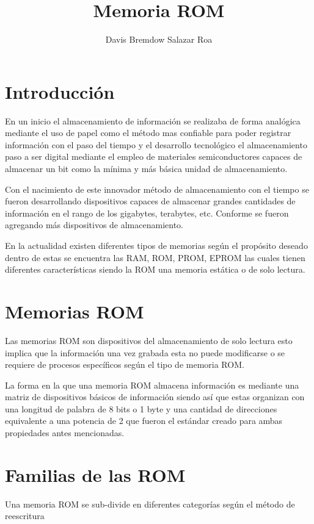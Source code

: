 \documentclass[stu, 12pt, floatsintext, ]{apa7}
\title{Memoria ROM}
\author{Davis Bremdow Salazar Roa}
\begin{document}
	
	\maketitle
	\newpage
	
	\section{Introducción}
	En un inicio el almacenamiento de información se realizaba de forma analógica mediante el uso de papel como el método mas confiable para poder registrar información con el paso del tiempo y el desarrollo tecnológico el almacenamiento paso a ser digital mediante el empleo de materiales semiconductores capaces de almacenar un bit como la mínima y más básica unidad de almacenamiento.
	
	Con el nacimiento de este innovador método de almacenamiento con el tiempo se fueron desarrollando dispositivos capaces de almacenar grandes cantidades de información en el rango de los gigabytes, terabytes, etc. Conforme se fueron agregando más dispositivos de almacenamiento.
	
	En la actualidad existen diferentes tipos de memorias según el propósito deseado dentro de estas se encuentra las RAM, ROM, PROM, EPROM las cuales tienen diferentes características siendo la ROM una memoria estática o de solo lectura.
	
	\newpage
	
	\section{Memorias ROM}
	Las memorias ROM son dispositivos del almacenamiento de solo lectura esto implica que la información una vez grabada esta no puede modificarse o se requiere de procesos específicos según el tipo de memoria ROM.
	
	La forma en la que una memoria ROM almacena información es mediante una matriz de dispositivos básicos de información siendo así que estas organizan con una longitud de palabra de 8 bits o 1 byte y una cantidad de direcciones equivalente a una potencia de 2 que fueron el estándar creado para ambas propiedades antes mencionadas.
	
	\section{Familias de las ROM}
	Una memoria ROM se sub-divide en diferentes categorías según el método de reescritura 
	\section{}
	
\end{document}

